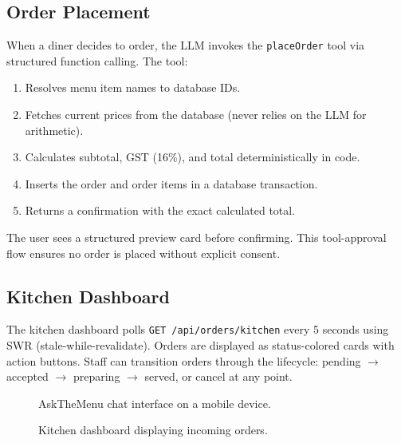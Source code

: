 \subsection{Order Placement}
When a diner decides to order, the LLM invokes the \texttt{placeOrder} tool via structured function calling. The tool:
\begin{enumerate}
    \item Resolves menu item names to database IDs.
    \item Fetches current prices from the database (never relies on the LLM for arithmetic).
    \item Calculates subtotal, GST (16\%), and total deterministically in code.
    \item Inserts the order and order items in a database transaction.
    \item Returns a confirmation with the exact calculated total.
\end{enumerate}

The user sees a structured preview card before confirming. This tool-approval flow ensures no order is placed without explicit consent.

\subsection{Kitchen Dashboard}
The kitchen dashboard polls \texttt{GET /api/orders/kitchen} every 5 seconds using SWR (stale-while-revalidate). Orders are displayed as status-colored cards with action buttons. Staff can transition orders through the lifecycle: pending $\rightarrow$ accepted $\rightarrow$ preparing $\rightarrow$ served, or cancel at any point.

\begin{figure}[h]
    \centering
    \caption{AskTheMenu chat interface on a mobile device.}\label{fig:chat-ui}
\end{figure}

\begin{figure}[h]
    \centering
    \caption{Kitchen dashboard displaying incoming orders.}\label{fig:kitchen-ui}
\end{figure}


